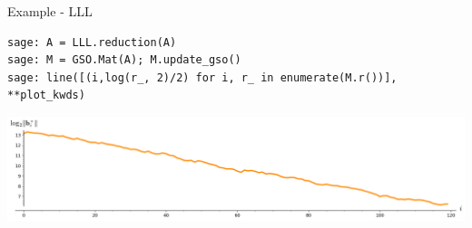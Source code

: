 \documentclass[xcolor=table,10pt,aspectratio=169]{beamer}
\begin{document}
\begin{frame}[label={sec:org0aa2a19},fragile]{Example - LLL}
 \lstset{language=sage,label= ,caption= ,captionpos=b,numbers=none}
\begin{lstlisting}
sage: A = LLL.reduction(A)
sage: M = GSO.Mat(A); M.update_gso()
sage: line([(i,log(r_, 2)/2) for i, r_ in enumerate(M.r())], **plot_kwds)
\end{lstlisting}

\begin{center}
\includegraphics[width=.9\linewidth]{gram-schmidt-norms-lll.png}
\end{center}
\end{frame}
\end{document}
